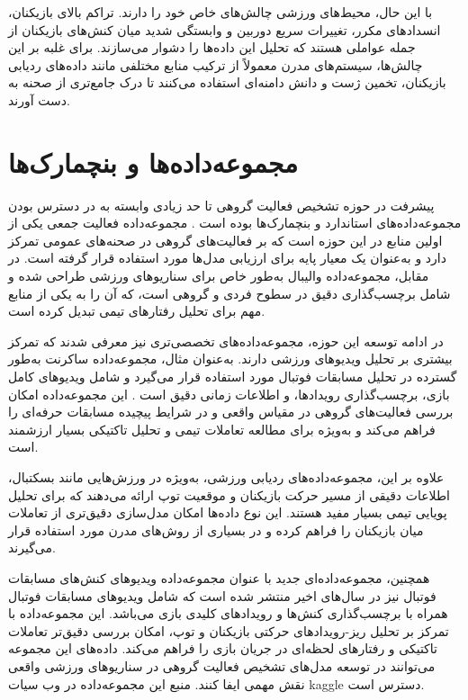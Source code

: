 \documentclass[12pt]{report}
\begin{document}
با این حال، محیط‌های ورزشی چالش‌های خاص خود را دارند. تراکم بالای بازیکنان، انسدادهای مکرر، تغییرات سریع دوربین و وابستگی شدید میان کنش‌های بازیکنان از جمله عواملی هستند که تحلیل این داده‌ها را دشوار می‌سازند. برای غلبه بر این چالش‌ها، سیستم‌های مدرن معمولاً از ترکیب منابع مختلفی مانند داده‌های ردیابی بازیکنان، تخمین ژست و دانش دامنه‌ای استفاده می‌کنند تا درک جامع‌تری از صحنه به دست آورند.

\section{مجموعه‌داده‌ها و بنچمارک‌ها}
پیشرفت در حوزه تشخیص فعالیت گروهی تا حد زیادی وابسته به در دسترس بودن مجموعه‌داده‌های استاندارد و بنچمارک‌ها بوده است \cite{one,three}. مجموعه‌داده فعالیت جمعی یکی از اولین منابع در این حوزه است که بر فعالیت‌های گروهی در صحنه‌های عمومی تمرکز دارد و به‌عنوان یک معیار پایه برای ارزیابی مدل‌ها مورد استفاده قرار گرفته است. در مقابل، مجموعه‌داده والیبال به‌طور خاص برای سناریوهای ورزشی طراحی شده و شامل برچسب‌گذاری دقیق در سطوح فردی و گروهی است، که آن را به یکی از منابع مهم برای تحلیل رفتارهای تیمی تبدیل کرده است.

در ادامه توسعه این حوزه، مجموعه‌داده‌های تخصصی‌تری نیز معرفی شدند که تمرکز بیشتری بر تحلیل ویدیوهای ورزشی دارند. به‌عنوان مثال، مجموعه‌داده ساکرنت به‌طور گسترده در تحلیل مسابقات فوتبال مورد استفاده قرار می‌گیرد و شامل ویدیوهای کامل بازی، برچسب‌گذاری رویدادها، و اطلاعات زمانی دقیق است \cite{twentyfour}. این مجموعه‌داده امکان بررسی فعالیت‌های گروهی در مقیاس واقعی و در شرایط پیچیده مسابقات حرفه‌ای را فراهم می‌کند و به‌ویژه برای مطالعه تعاملات تیمی و تحلیل تاکتیکی بسیار ارزشمند است.

علاوه بر این، مجموعه‌داده‌های ردیابی ورزشی، به‌ویژه در ورزش‌هایی مانند بسکتبال، اطلاعات دقیقی از مسیر حرکت بازیکنان و موقعیت توپ ارائه می‌دهند که برای تحلیل پویایی تیمی بسیار مفید هستند. این نوع داده‌ها امکان مدل‌سازی دقیق‌تری از تعاملات میان بازیکنان را فراهم کرده و در بسیاری از روش‌های مدرن مورد استفاده قرار می‌گیرند.

همچنین، مجموعه‌داده‌ای جدید با عنوان مجموعه‌داده ویدیوهای کنش‌های مسابقات فوتبال نیز در سال‌های اخیر منتشر شده است که شامل ویدیوهای مسابقات فوتبال همراه با برچسب‌گذاری کنش‌ها و رویدادهای کلیدی بازی می‌باشد. این مجموعه‌داده با تمرکز بر تحلیل ریز-رویدادهای حرکتی بازیکنان و توپ، امکان بررسی دقیق‌تر تعاملات تاکتیکی و رفتارهای لحظه‌ای در جریان بازی را فراهم می‌کند. داده‌های این مجموعه می‌توانند در توسعه مدل‌های تشخیص فعالیت گروهی در سناریوهای ورزشی واقعی نقش مهمی ایفا کنند. منبع این مجموعه‌داده در وب سیات kaggle دسترس است. 
\end{document}
